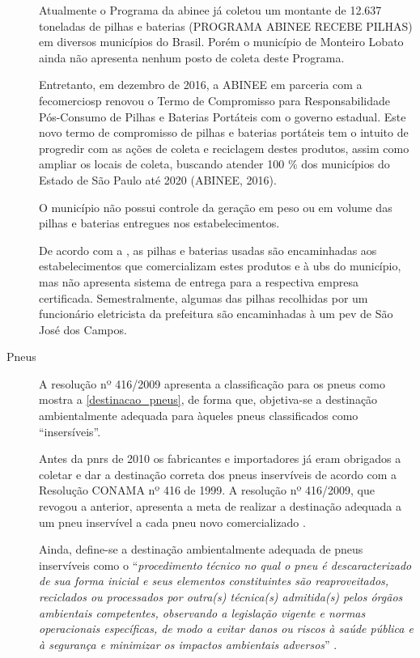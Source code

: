 \begin{description}
	Atualmente o Programa da \gls{abinee} já coletou um montante de 12.637 toneladas de pilhas e baterias (PROGRAMA ABINEE RECEBE PILHAS) em diversos municípios do Brasil. Porém o município de Monteiro Lobato ainda não apresenta nenhum posto de coleta deste Programa.
	
	Entretanto, em dezembro de 2016, a ABINEE em parceria com a \gls{fecomerciosp} renovou o Termo de Compromisso para Responsabilidade Pós-Consumo de Pilhas e Baterias Portáteis com o governo estadual. Este novo termo de compromisso de pilhas e baterias portáteis tem o intuito de progredir com as ações de coleta e reciclagem destes produtos, assim como ampliar os locais de coleta, buscando atender 100 \% dos municípios do Estado de São Paulo até 2020 (ABINEE, 2016).
	
	O município não possui controle da geração em peso ou em volume das pilhas e baterias entregues nos estabelecimentos.
	
	De acordo com a , as pilhas e baterias usadas são encaminhadas aos estabelecimentos que comercializam estes produtos e à \gls{ubs} do município, mas não apresenta sistema de entrega para a respectiva empresa certificada. Semestralmente, algumas das pilhas recolhidas por um funcionário eletricista da prefeitura são encaminhadas à um \gls{pev} de São José dos Campos.
	
	
	\item[Pneus] A resolução nº 416/2009 apresenta a classificação para os pneus como mostra a \autoref{destinacao_pneus}, de forma que, objetiva-se a destinação ambientalmente adequada para àqueles pneus classificados como “insersíveis”.	
	
	
	
	Antes da \gls{pnrs} de 2010 os fabricantes e importadores já eram obrigados a coletar e dar a destinação correta dos pneus inservíveis de acordo com a Resolução CONAMA nº 416 de 1999. A resolução nº 416/2009, que revogou a anterior, apresenta a meta de realizar a destinação adequada a um pneu inservível a cada pneu novo comercializado \cite{conama:416}.
	
	Ainda, define-se a destinação ambientalmente adequada de pneus inservíveis como o “\textit{procedimento técnico no qual o pneu é descaracterizado de sua forma inicial e seus elementos constituintes são reaproveitados, reciclados ou processados por outra(s) técnica(s) admitida(s) pelos órgãos ambientais competentes, observando a legislação vigente e normas operacionais específicas, de modo a evitar danos ou riscos à saúde pública e à segurança e minimizar os impactos ambientais adversos}” \cite{conama:416}. 
	

\end{description}
